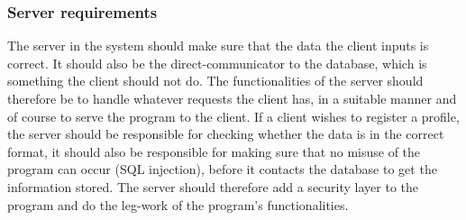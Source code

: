 \subsubsection{Server requirements}


The server in the system should make sure that the data the client inputs is correct. It should also be the direct-communicator to the database, which is something the client should not do. The functionalities of the server should therefore be to handle whatever requests the client has, in a suitable manner and of course to serve the program to the client. If a client wishes to register a profile, the server should be responsible for checking whether the data is in the correct format, it should also be responsible for making sure that no misuse of the program can occur (SQL injection), before it contacts the database to get the information stored. The server should therefore add a security layer to the program and do the leg-work of the program's functionalities.